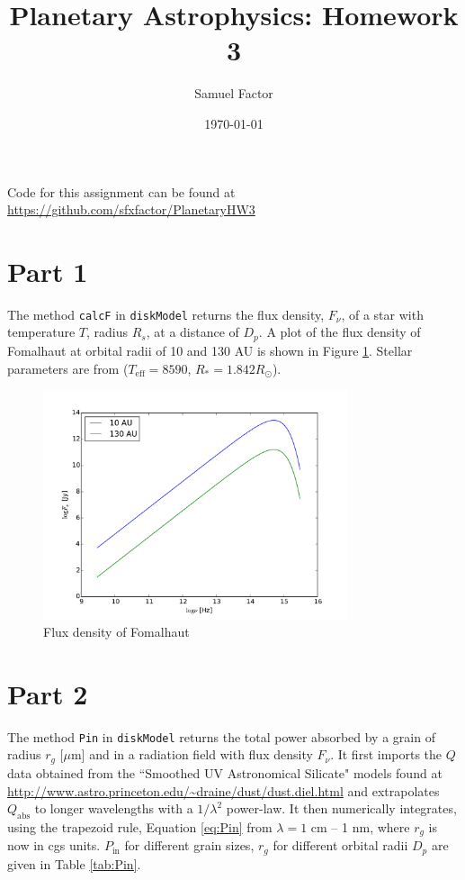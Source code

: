 \documentclass[12pt,preprint]{aastex}
\title{Planetary Astrophysics: Homework 3}
\author{Samuel Factor}
\date{\today}                                           %
\begin{document}
\maketitle
Code for this assignment can be found at \url{https://github.com/sfxfactor/PlanetaryHW3}

\section{Part 1}
The method \texttt{calcF} in \texttt{diskModel} returns the flux density, $F_\nu$, of a star with temperature $T$, radius $R_s$, at a distance of $D_p$. A plot of the flux density of Fomalhaut at orbital radii of 10 and 130 AU is shown in Figure \ref{fig:FomFnu}. Stellar parameters are from \citet{Fom} ($T_\mathrm{eff}=8590$, $R_*=1.842 R_\odot$). 

\begin{figure}[htbp]
\begin{center}
\includegraphics[width=0.8\textwidth]{FomFnu.pdf}
    \caption{Flux density of Fomalhaut}
    \label{fig:FomFnu}
\end{center}
\end{figure}

\section{Part 2}
The method \texttt{Pin} in \texttt{diskModel} returns the total power absorbed by a grain of radius $r_g$ [$\mu$m] and in a radiation field with flux density $F_\nu$. It first imports the $Q$ data obtained from the ``Smoothed UV Astronomical Silicate" models found at \url{http://www.astro.princeton.edu/~draine/dust/dust.diel.html} and extrapolates $Q_\mathrm{abs}$ to longer wavelengths with a $1/\lambda^2$ power-law. It then numerically integrates, using the trapezoid rule, Equation \ref{eq:Pin} from $\lambda=1$ cm -- 1 nm, where $r_g$ is now in cgs units. $P_\mathrm{in}$ for different grain sizes, $r_g$ for different orbital radii $D_p$ are given in Table \ref{tab:Pin}.
\end{document}
